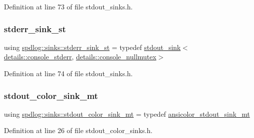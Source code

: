 Definition at line 73 of file stdout\+\_\+sinks.\+h.

\mbox{\label{namespacespdlog_1_1sinks_ac7f13feb3827330eb5b5c1998356c798}} 
\subsubsection{\texorpdfstring{stderr\+\_\+sink\+\_\+st}{stderr\_sink\_st}}
{\footnotesize\ttfamily using \hyperlink{namespacespdlog_1_1sinks_ac7f13feb3827330eb5b5c1998356c798}{spdlog\+::sinks\+::stderr\+\_\+sink\+\_\+st} = typedef \hyperlink{classspdlog_1_1sinks_1_1stdout__sink}{stdout\+\_\+sink}$<$\hyperlink{structspdlog_1_1details_1_1console__stderr}{details\+::console\+\_\+stderr}, \hyperlink{structspdlog_1_1details_1_1console__nullmutex}{details\+::console\+\_\+nullmutex}$>$}



Definition at line 74 of file stdout\+\_\+sinks.\+h.

\mbox{\label{namespacespdlog_1_1sinks_af5b53d274a7f3e3528ef994035cc7204}} 
\subsubsection{\texorpdfstring{stdout\+\_\+color\+\_\+sink\+\_\+mt}{stdout\_color\_sink\_mt}}
{\footnotesize\ttfamily using \hyperlink{namespacespdlog_1_1sinks_af5b53d274a7f3e3528ef994035cc7204}{spdlog\+::sinks\+::stdout\+\_\+color\+\_\+sink\+\_\+mt} = typedef \hyperlink{namespacespdlog_1_1sinks_a10475192b7db414c386fbccb7401d852}{ansicolor\+\_\+stdout\+\_\+sink\+\_\+mt}}



Definition at line 26 of file stdout\+\_\+color\+\_\+sinks.\+h.

\mbox{\label{namespacespdlog_1_1sinks_ae3eb6549df72c3c46dea34fd35fee93e}} 
